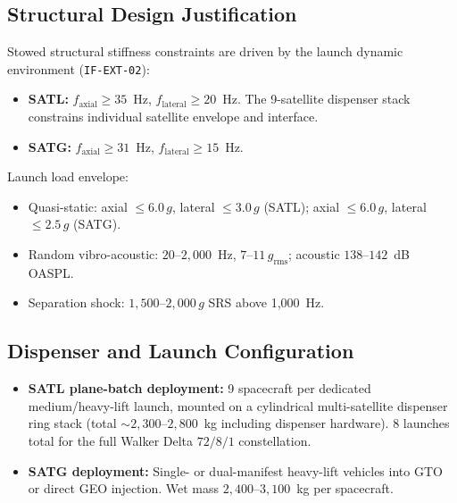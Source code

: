 \subsection{Structural Design Justification}

Stowed structural stiffness constraints are driven by the launch dynamic environment (\texttt{IF-EXT-02}):
\begin{itemize}
    \item \textbf{SATL:} $f_{\text{axial}} \ge 35$~Hz, $f_{\text{lateral}} \ge 20$~Hz. The 9-satellite dispenser stack constrains individual satellite envelope and interface.
    \item \textbf{SATG:} $f_{\text{axial}} \ge 31$~Hz, $f_{\text{lateral}} \ge 15$~Hz.
\end{itemize}

Launch load envelope:
\begin{itemize}
    \item Quasi-static: axial $\le 6.0\,g$, lateral $\le 3.0\,g$ (SATL); axial $\le 6.0\,g$, lateral $\le 2.5\,g$ (SATG).
    \item Random vibro-acoustic: $20$--$2{,}000$~Hz, $7$--$11\,g_{\text{rms}}$; acoustic $138$--$142$~dB OASPL.
    \item Separation shock: $1{,}500$--$2{,}000\,g$ SRS above 1,000~Hz.
\end{itemize}

\subsection{Dispenser and Launch Configuration}

\begin{itemize}
    \item \textbf{SATL plane-batch deployment:} 9 spacecraft per dedicated medium/heavy-lift launch, mounted on a cylindrical multi-satellite dispenser ring stack (total ${\sim}2{,}300$--$2{,}800$~kg including dispenser hardware). 8 launches total for the full Walker Delta $72/8/1$ constellation.
    \item \textbf{SATG deployment:} Single- or dual-manifest heavy-lift vehicles into GTO or direct GEO injection. Wet mass $2{,}400$--$3{,}100$~kg per spacecraft.
\end{itemize}
